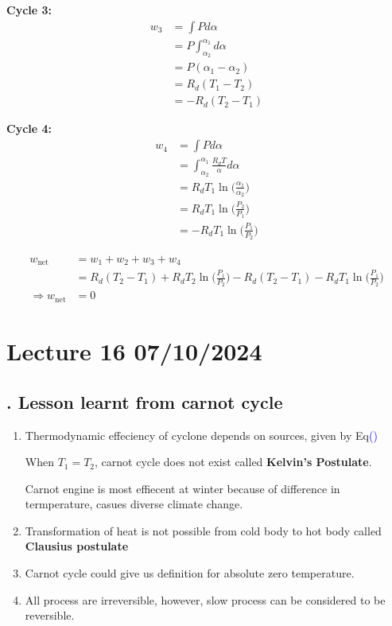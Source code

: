 \documentclass[fleqn,10pt]{SelfArx} %
\newcommand{\myeqref}[1]{\textcolor{blue}{\textup{(\getrefnumber{#1})}}}
\begin{document}
\textbf{Cycle 3:}
\begin{align*}
    w_3 &= \int P d\alpha  \\
        &= P \int_{\alpha_2}^{\alpha_1} d\alpha \\
        &= P(\alpha_1 - \alpha_2) \\
        &= R_d(T_1-T_2) \\
        &= - R_d(T_2-T_1)
\end{align*}

\textbf{Cycle 4:}
\begin{align*}
    w_4 &= \int P d\alpha  \\
        &= \int_{\alpha_2}^{\alpha_1} \frac{R_d T}{\alpha} d\alpha \\
        &= R_d T_1 \ln \Big(\frac{\alpha_1}{\alpha_2}\Big) \\
        &= R_d T_1 \ln \Big(\frac{P_2}{P_1}\Big) \\
        &= - R_d T_1 \ln \Big(\frac{P_1}{P_2}\Big)
\end{align*}

\begin{align*}
    w_{\text{net}} &= w_1 + w_2 + w_3 + w_4 \\
                   &= R_d(T_2-T_1) + R_d T_2 \ln \Big(\frac{P_1}{P_2}\Big) - R_d(T_2-T_1) - R_d T_1 \ln \Big(\frac{P_1}{P_2}\Big) \\
    \Rightarrow w_{\text{net}} &= 0
\end{align*}

\clearpage

\section{Lecture 16 07/10/2024}

\subsection{. Lesson learnt from carnot cycle}
\begin{enumerate}[I]
    \item Thermodynamic effeciency of cyclone depends on sources, given by Eq\myeqref{eq:eff_carnot}

    When $T_1 =T_2$, carnot cycle does not exist called \textbf{Kelvin's Postulate}.

    Carnot engine is most effiecent at winter because of difference in termperature, casues diverse climate change.

    \item Transformation of heat is not possible from cold body to hot body called \textbf{Clausius postulate}

    \item Carnot cycle could give us definition for absolute zero temperature.

    \item All process are irreversible, however, slow process can be considered to be reversible.
\end{enumerate}
\end{document}
